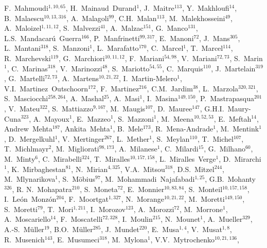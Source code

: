 F.~Mahmoudi$^{{1, 10, 65}}$,
H.~Mainaud~Durand$^{{1}}$,
J.~Maitre$^{{113}}$,
Y.~Makhloufi$^{{14}}$,
B.~Malaescu$^{{10, 13, 316}}$,
A.~Malagoli$^{{99}}$,
C.H.~Malan$^{{113}}$,
M.~Malekhosseini$^{{49}}$,
A.~Maloizel$^{{1, 11, 12}}$,
S.~Malvezzi$^{{41}}$,
A.~Malzac$^{{151}}$,
G.~Manco$^{{131}}$,
L.S.~Mandacar{\'u}~Guerra$^{{166}}$,
P.~Manfrinetti$^{{99, 317}}$,
E.~Manoni$^{{72}}$,
J.~Mans$^{{305}}$,
L.~Mantani$^{{318}}$,
S.~Manzoni$^{{1}}$,
L.~Marafatto$^{{170}}$,
C.~Marcel$^{{1}}$,
T.~Marcel$^{{114}}$,
R.~Marchevski$^{{119}}$,
G.~Marchiori$^{{10, 11, 12}}$,
F.~Mariani$^{{54, 98}}$,
V.~Mariani$^{{72, 73}}$,
S.~Marin$^{{1}}$,
C.~Marinas$^{{318}}$,
V.~Marinozzi$^{{48}}$,
S.~Mariotto$^{{54, 55}}$,
C.~Marquis$^{{110}}$,
J.~Martelain$^{{319}}$,
G.~Martelli$^{{72, 73}}$,
A.~Martens$^{{10, 21, 22}}$,
I.~Martin-Melero$^{{1}}$,
V.I.~Martinez~Outschoorn$^{{172}}$,
F.~Martinez$^{{216}}$,
C.M.~Jardim$^{{38}}$,
L.~Marzola$^{{320, 321}}$,
S.~Masciocchi$^{{258, 264}}$,
A.~Mashal$^{{25}}$,
A.~Masi$^{{1}}$,
I.~Masina$^{{149, 150}}$,
P.~Mastrapasqua$^{{201}}$,
V.~Mateu$^{{322}}$,
S.~Mattiazzo$^{{9, 167}}$,
M.~Maugis$^{{107}}$,
D.~Mauree$^{{147}}$,
G.H.I.~Maury-Cuna$^{{323}}$,
A.~Mayoux$^{{1}}$,
E.~Mazzeo$^{{1}}$,
S.~Mazzoni$^{{1}}$,
M.~Meena$^{{10, 52, 53}}$,
E.~Meftah$^{{14}}$,
Andrew~Mehta$^{{187}}$,
Ankita~Mehta$^{{1}}$,
B.~Mele$^{{173}}$,
R.~Mena-Andrade$^{{1}}$,
M.~Mentink$^{{1}}$,
D.~Mergelkuhl$^{{1}}$,
V.~Mertinger$^{{267}}$,
L.~Mether$^{{1}}$,
S.~Meylan$^{{110}}$,
T.~Michel$^{{107}}$,
T.~Michlmayr$^{{2}}$,
M.~Migliorati$^{{98, 173}}$,
A.~Milanese$^{{1}}$,
C.~Milardi$^{{15}}$,
G.~Milhano$^{{60}}$,
M.~Minty$^{{6}}$,
C.~Mirabelli$^{{324}}$,
T.~Miralles$^{{10, 157, 158}}$,
L.~Miralles~Verge$^{{1}}$,
D.~Mirarchi$^{{1}}$,
K.~Mirbaghestan$^{{81}}$,
N.~Mirian$^{{4, 325}}$,
V.A.~Mitsou$^{{318}}$,
D.S.~Mitzel$^{{244}}$,
M.~Mlynarikova$^{{1}}$,
S.~M{\"o}bius$^{{97}}$,
M.~Mohammadi~Najafabadi$^{{1, 25}}$,
G.B.~Mohanty$^{{326}}$,
R. N.~Mohapatra$^{{210}}$,
S.~Moneta$^{{72}}$,
E.~Monnier$^{{10, 83, 84}}$,
S.~Monteil$^{{10, 157, 158}}$,
I.~Le{\'o}n~Monz{\'o}n$^{{204}}$,
F.~Moortgat$^{{1, 327}}$,
N.~Morange$^{{10, 21, 22}}$,
M.~Moretti$^{{149, 150}}$,
S.~Moretti$^{{79}}$,
T.~Mori$^{{1, 211}}$,
I.~Morozov$^{{123}}$,
A.~Morozzi$^{{72}}$,
M.~Morrone$^{{1}}$,
A.~Moscariello$^{{14}}$,
F.~Moscatelli$^{{72, 328}}$,
I.~Moulin$^{{215}}$,
N.~Mounet$^{{1}}$,
A.~Mueller$^{{329}}$,
A.-S.~M{\"u}ller$^{{19}}$,
B.O.~M{\"u}ller$^{{285}}$,
J.~Mundet$^{{220}}$,
E.~Musa$^{{1, 4}}$,
V.~Musat$^{{1, 8}}$,
R.~Musenich$^{{143}}$,
E.~Musumeci$^{{318}}$,
M.~Mylona$^{{1}}$,
V.V.~Mytrochenko$^{{10, 21, 136}}$,
